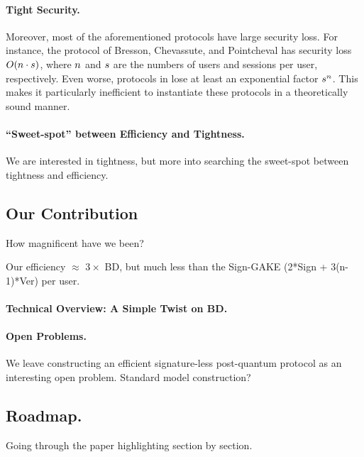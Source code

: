 
\paragraph{Tight Security.}
Moreover, most of the aforementioned protocols have large security loss. For instance, the protocol of Bresson, Chevassute, and Pointcheval \cite{AC:BreChePoi01} has security loss $O(n \cdot s)$, where $n$ and $s$ are the numbers of users and sessions per user, respectively. Even worse, protocols in \cite{CCS:BCPQ01,CANS:LiYan13} lose at least an exponential factor $s^{n}$. This makes it particularly inefficient to instantiate these protocols in a theoretically sound manner.


\paragraph{``Sweet-spot'' between Efficiency and Tightness.}
We are interested in tightness, but more into searching the sweet-spot between tightness and efficiency.

\subsection{Our Contribution}
How magnificent have we been?

Our efficiency $\approx$ $3\times $ BD, but much less than the Sign-GAKE (2*Sign + 3(n-1)*Ver) per user.

\paragraph{Technical Overview: A Simple Twist on BD.}

\paragraph{Open Problems.}
We leave constructing an efficient signature-less post-quantum \introGAKE protocol as an interesting open problem. 
Standard model construction?


\subsection{Roadmap.}
Going through the paper highlighting section by section.
